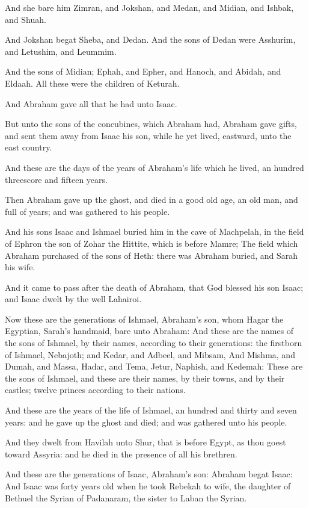 \Verse And she bare him Zimran, and Jokshan, and Medan, and Midian, and Ishbak, and Shuah.

\Verse And Jokshan begat Sheba, and Dedan. And the sons of Dedan were Asshurim, and Letushim, and Leummim.

\Verse And the sons of Midian; Ephah, and Epher, and Hanoch, and Abidah, and Eldaah. All these were the children of Keturah.

\Verse And Abraham gave all that he had unto Isaac.

\Verse But unto the sons of the concubines, which Abraham had, Abraham gave gifts, and sent them away from Isaac his son, while he yet lived, eastward, unto the east country.

\Verse And these are the days of the years of Abraham's life which he lived, an hundred threescore and fifteen years.

\Verse Then Abraham gave up the ghost, and died in a good old age, an old man, and full of years; and was gathered to his people.

\Verse And his sons Isaac and Ishmael buried him in the cave of Machpelah, in the field of Ephron the son of Zohar the Hittite, which is before Mamre; \Verse The field which Abraham purchased of the sons of Heth: there was Abraham buried, and Sarah his wife.

\Verse And it came to pass after the death of Abraham, that God blessed his son Isaac; and Isaac dwelt by the well Lahairoi.

\Verse Now these are the generations of Ishmael, Abraham's son, whom Hagar the Egyptian, Sarah's handmaid, bare unto Abraham: \Verse And these are the names of the sons of Ishmael, by their names, according to their generations: the firstborn of Ishmael, Nebajoth; and Kedar, and Adbeel, and Mibsam, \Verse And Mishma, and Dumah, and Massa, \Verse Hadar, and Tema, Jetur, Naphish, and Kedemah: \Verse These are the sons of Ishmael, and these are their names, by their towns, and by their castles; twelve princes according to their nations.

\Verse And these are the years of the life of Ishmael, an hundred and thirty and seven years: and he gave up the ghost and died; and was gathered unto his people.

\Verse And they dwelt from Havilah unto Shur, that is before Egypt, as thou goest toward Assyria: and he died in the presence of all his brethren.

\Verse And these are the generations of Isaac, Abraham's son: Abraham begat Isaac: \Verse And Isaac was forty years old when he took Rebekah to wife, the daughter of Bethuel the Syrian of Padanaram, the sister to Laban the Syrian.


